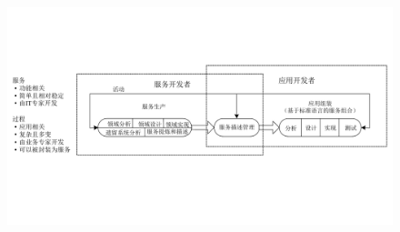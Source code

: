 \begin{figure}[H]
    \vspace{-0.5em}
	\centering
	\includegraphics[width=\textwidth]{images/面向服务的泛型.pdf}
    \vspace{-1em}
\end{figure}

